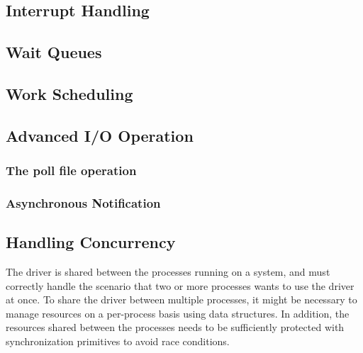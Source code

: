 \subsection{Interrupt Handling}\label{sec:interrupt-handling}


\subsection{Wait Queues}\label{sec:wait-queues}


\subsection{Work Scheduling}\label{sec:work-scheduling}


\subsection{Advanced I/O Operation}
\subsubsection{The poll file operation}\label{sec:the-poll-file-operation}
\subsubsection{Asynchronous Notification}\label{sec:asynchronous-notification}



\subsection{Handling Concurrency}\label{sec:handling-concurrency}
The driver is shared between the processes running on a system, and must correctly handle the scenario that two or more processes wants to use the driver at once. To share the driver between multiple processes, it might be necessary to manage resources on a per-process basis using data structures. In addition, the resources shared between the processes needs to be sufficiently protected with synchronization primitives to avoid race conditions.


